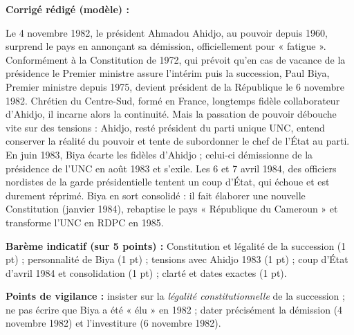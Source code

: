 \documentclass[11pt]{article}
\begin{document}
\begin{corrige}
\textbf{Corrigé rédigé (modèle) :}

Le 4 novembre 1982, le président Ahmadou Ahidjo, au pouvoir depuis 1960, surprend le pays en annonçant sa démission, officiellement pour « fatigue ». Conformément à la Constitution de 1972, qui prévoit qu'en cas de vacance de la présidence le Premier ministre assure l'intérim puis la succession, Paul Biya, Premier ministre depuis 1975, devient président de la République le 6 novembre 1982. Chrétien du Centre-Sud, formé en France, longtemps fidèle collaborateur d'Ahidjo, il incarne alors la continuité. Mais la passation de pouvoir débouche vite sur des tensions : Ahidjo, resté président du parti unique UNC, entend conserver la réalité du pouvoir et tente de subordonner le chef de l'État au parti. En juin 1983, Biya écarte les fidèles d'Ahidjo ; celui-ci démissionne de la présidence de l'UNC en août 1983 et s'exile. Les 6 et 7 avril 1984, des officiers nordistes de la garde présidentielle tentent un coup d'État, qui échoue et est durement réprimé. Biya en sort consolidé : il fait élaborer une nouvelle Constitution (janvier 1984), rebaptise le pays « République du Cameroun » et transforme l'UNC en RDPC en 1985.

\textbf{Barème indicatif (sur 5 points) :} Constitution et légalité de la succession (1 pt) ; personnalité de Biya (1 pt) ; tensions avec Ahidjo 1983 (1 pt) ; coup d'État d'avril 1984 et consolidation (1 pt) ; clarté et dates exactes (1 pt).

\textbf{Points de vigilance :} insister sur la \emph{légalité constitutionnelle} de la succession ; ne pas écrire que Biya a été « élu » en 1982 ; dater précisément la démission (4 novembre 1982) et l'investiture (6 novembre 1982).
\end{corrige}
\end{document}
